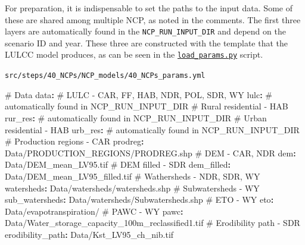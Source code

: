 \documentclass[
  letterpaper,
  DIV=11,
  numbers=noendperiod]{scrreprt}
\newenvironment{Shaded}{\begin{snugshade}}{\end{snugshade}}
\newcommand{\AttributeTok}[1]{\textcolor[rgb]{0.40,0.45,0.13}{#1}}
\newcommand{\CommentTok}[1]{\textcolor[rgb]{0.37,0.37,0.37}{#1}}
\newcommand{\FunctionTok}[1]{\textcolor[rgb]{0.28,0.35,0.67}{#1}}
\newcommand{\KeywordTok}[1]{\textcolor[rgb]{0.00,0.23,0.31}{\textbf{#1}}}
\begin{document}
For preparation, it is indispensable to set the paths to the input data.
Some of these are shared among multiple NCP, as noted in the comments.
The first three layers are automatically found in the
\texttt{NCP\_RUN\_INPUT\_DIR} and depend on the scenario ID and year.
These three are constructed with the template that the LULCC model
produces, as can be seen in the
\href{https://github.com/cbueth/Future-EI/tree/main/src/steps/40_NCPs/NCP_models/load_params.py}{\texttt{load\_params.py}}
script.

\begin{codelisting}

\caption{\texttt{src/steps/40\_NCPs/NCP\_models/40\_NCPs\_params.yml}}

\begin{Shaded}
\begin{Highlighting}[]
\CommentTok{\# Data}
\FunctionTok{data}\KeywordTok{:}
\CommentTok{  \# LULC               {-} CAR, FF, HAB, NDR, POL, SDR, WY}
\AttributeTok{  }\FunctionTok{lulc}\KeywordTok{:}\CommentTok{ \# automatically found in NCP\_RUN\_INPUT\_DIR}
\CommentTok{  \# Rural residential  {-} HAB}
\AttributeTok{  }\FunctionTok{rur\_res}\KeywordTok{:}\CommentTok{ \# automatically found in NCP\_RUN\_INPUT\_DIR}
\CommentTok{  \# Urban residential  {-} HAB}
\AttributeTok{  }\FunctionTok{urb\_res}\KeywordTok{:}\CommentTok{ \# automatically found in NCP\_RUN\_INPUT\_DIR}
\CommentTok{  \# Production regions {-} CAR}
\AttributeTok{  }\FunctionTok{prodreg}\KeywordTok{:}\AttributeTok{ Data/PRODUCTION\_REGIONS/PRODREG.shp}
\CommentTok{  \# DEM                {-} CAR, NDR}
\AttributeTok{  }\FunctionTok{dem}\KeywordTok{:}\AttributeTok{ Data/DEM\_mean\_LV95.tif}
\CommentTok{  \# DEM filled         {-} SDR}
\AttributeTok{  }\FunctionTok{dem\_filled}\KeywordTok{:}\AttributeTok{ Data/DEM\_mean\_LV95\_filled.tif}
\CommentTok{  \# Wathersheds        {-} NDR, SDR, WY}
\AttributeTok{  }\FunctionTok{watersheds}\KeywordTok{:}\AttributeTok{ Data/watersheds/watersheds.shp}
\CommentTok{  \# Subwatersheds      {-} WY}
\AttributeTok{  }\FunctionTok{sub\_watersheds}\KeywordTok{:}\AttributeTok{ Data/watersheds/Subwatersheds.shp}
\CommentTok{  \# ETO                {-} WY}
\AttributeTok{  }\FunctionTok{eto}\KeywordTok{:}\AttributeTok{ Data/evapotranspiration/}
\CommentTok{  \# PAWC               {-} WY}
\AttributeTok{  }\FunctionTok{pawc}\KeywordTok{:}\AttributeTok{ Data/Water\_storage\_capacity\_100m\_reclassified1.tif}
\CommentTok{  \# Erodibility path   {-} SDR}
\AttributeTok{  }\FunctionTok{erodibility\_path}\KeywordTok{:}\AttributeTok{ Data/Kst\_LV95\_ch\_nib.tif}

\end{Highlighting}
\end{Shaded}
\end{codelisting}
\end{document}
